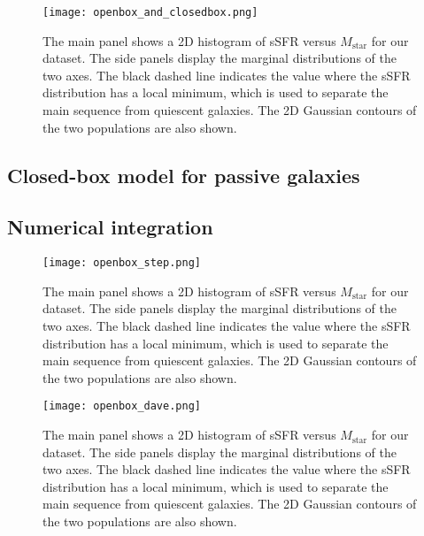 \documentclass[fleqn,usenatbib]{mnras}
\begin{document}
\begin{figure}
    \begin{centering}
	\texttt{[image: openbox\_and\_closedbox.png]}
    \caption{The main panel shows a 2D histogram of sSFR versus $M_{\text{star}}$ for our dataset. The side panels display the marginal distributions of the two axes. The black dashed line indicates the value where the sSFR distribution has a local minimum, which is used to separate the main sequence from quiescent galaxies. The 2D Gaussian contours of the two populations are also shown.}
    \end{centering}
    \label{fig:openbox_and_closedbox}
\end{figure}


\subsection{Closed-box model for passive galaxies}\label{sec:closed_box}


\subsection{Numerical integration}\label{sec:numerical_integration}
\begin{figure}
    \begin{centering}
	\texttt{[image: openbox\_step.png]}
    \caption{The main panel shows a 2D histogram of sSFR versus $M_{\text{star}}$ for our dataset. The side panels display the marginal distributions of the two axes. The black dashed line indicates the value where the sSFR distribution has a local minimum, which is used to separate the main sequence from quiescent galaxies. The 2D Gaussian contours of the two populations are also shown.}
    \end{centering}
    \label{fig:openbox_step}
\end{figure}

\begin{figure}
    \begin{centering}
	\texttt{[image: openbox\_dave.png]}
    \caption{The main panel shows a 2D histogram of sSFR versus $M_{\text{star}}$ for our dataset. The side panels display the marginal distributions of the two axes. The black dashed line indicates the value where the sSFR distribution has a local minimum, which is used to separate the main sequence from quiescent galaxies. The 2D Gaussian contours of the two populations are also shown.}
    \end{centering}
    \label{fig:openbox_dave}
\end{figure}
\end{document}
